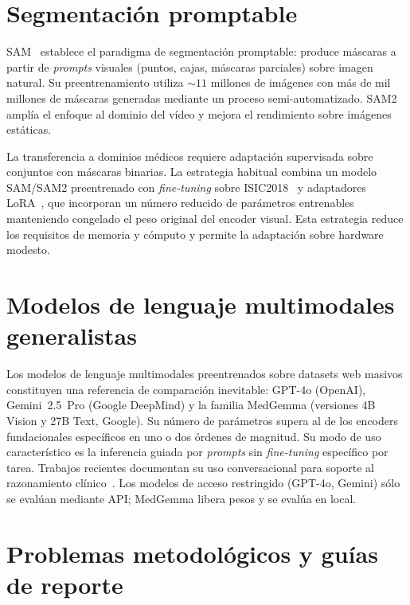 \section{Segmentación promptable}
\label{sec:segmentacion-sota}

SAM~\cite{sam2023} establece el paradigma de segmentación
promptable: produce máscaras a partir de \emph{prompts} visuales
(puntos, cajas, máscaras parciales) sobre imagen natural. Su
preentrenamiento utiliza $\sim 11$ millones de imágenes con
más de mil millones de máscaras generadas mediante un proceso
semi-automatizado. SAM2~\cite{sam2} amplía el enfoque al dominio
del vídeo y mejora el rendimiento sobre imágenes estáticas.

La transferencia a dominios médicos requiere adaptación supervisada
sobre conjuntos con máscaras binarias. La estrategia habitual
combina un modelo SAM/SAM2 preentrenado con \emph{fine-tuning} sobre
ISIC2018~\cite{isic2018} y adaptadores LoRA~\cite{lora}, que
incorporan un número reducido de parámetros entrenables manteniendo
congelado el peso original del encoder visual. Esta estrategia
reduce los requisitos de memoria y cómputo y permite la adaptación
sobre hardware modesto.

\section{Modelos de lenguaje multimodales generalistas}
\label{sec:llm-multimodal}

Los modelos de lenguaje multimodales preentrenados sobre datasets web
masivos constituyen una referencia de comparación inevitable: GPT-4o
(OpenAI), Gemini~2.5~Pro (Google DeepMind) y la familia MedGemma
(versiones 4B Vision y 27B Text, Google). Su número de parámetros
supera al de los encoders fundacionales específicos en uno o dos
órdenes de magnitud. Su modo de uso característico es la inferencia
guiada por \emph{prompts} sin \emph{fine-tuning} específico por
tarea. Trabajos recientes documentan su uso conversacional para
soporte al razonamiento clínico~\cite{amie2024,deepmind_aicoclinician}.
Los modelos de acceso restringido (GPT-4o, Gemini) sólo se evalúan
mediante API; MedGemma libera pesos y se evalúa en local.

\section{Problemas metodológicos y guías de reporte}
\label{sec:problemas-metodologicos}

